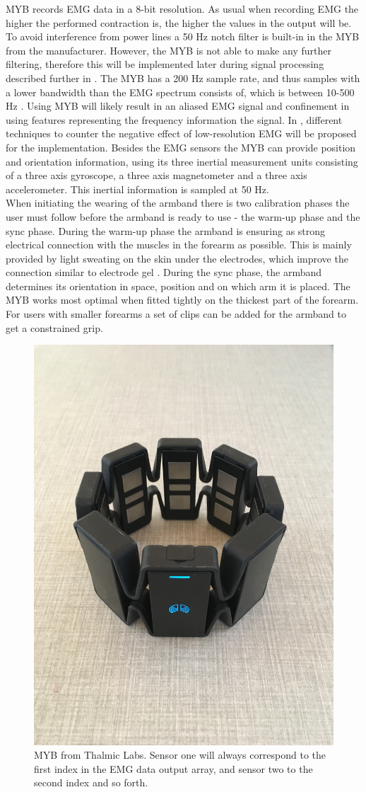 MYB records EMG data in a 8-bit resolution. As usual when recording EMG the higher the performed contraction is, the higher the values in the output will be. To avoid interference from power lines a 50 Hz notch filter is built-in in the MYB from the manufacturer. However, the MYB is not able to make any further filtering, therefore this will be implemented later during signal processing described further in . The MYB has a 200 Hz sample rate, and thus samples with a lower bandwidth than the EMG spectrum consists of, which is between 10-500 Hz \cite{Cram2012}. Using MYB will likely result in an aliased EMG signal and confinement in using features representing the frequency information the signal. In , different techniques to counter the negative effect of low-resolution EMG will be proposed for the implementation. 
Besides the EMG sensors the MYB can provide position and orientation information, using its three inertial measurement units consisting of a three axis gyroscope, a three axis magnetometer and a three axis accelerometer. This inertial information is sampled at 50 Hz. \cite{Myoarmband2013} \\
When initiating the wearing of the armband there is two calibration phases the user must follow before the armband is ready to use - the warm-up phase and the sync phase. During the warm-up phase the armband is ensuring as strong electrical connection with the muscles in the forearm as possible. This is mainly provided by light sweating on the skin under the electrodes, which improve the connection similar to electrode gel \cite{Cram2012}. During the sync phase, the armband determines its orientation in space, position and on which arm it is placed. The MYB works most optimal when fitted tightly on the thickest part of the forearm. For users with smaller forearms a set of clips can be added for the armband to get a constrained grip. \cite{Myoarmband2013}

\begin{figure}[H]                 
	\includegraphics[width=.4\textwidth]{figures/xBackground/myoband}  
	\caption{MYB from Thalmic Labs. Sensor one will always correspond to the first index in the EMG data output array, and sensor two to the second index and so forth.}
	\label{fig:myoarmband} 
\end{figure}